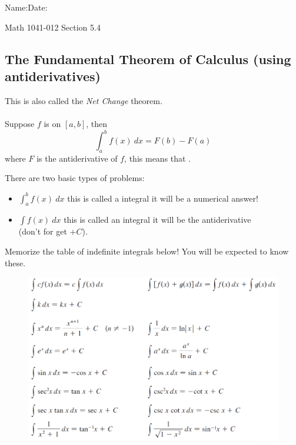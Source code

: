 \documentclass[10pt]{book}
\theoremstyle{definition}
\begin{document}
\begin{flushleft}
Name:\underline{\hspace{13cm}}Date:\underline{\hspace{2cm}}
\end{flushleft}
\begin{center}
{\Large Math 1041-012 \hspace{0.5cm} Section 5.4}
\end{center}

\begin{tcolorbox}
\subsection*{The Fundamental Theorem of Calculus (using antiderivatives)}
This is also called the \textit{Net Change} theorem.\\ \\
Suppose $f$ is \underline{\hspace{4cm}} on $[a,b]$, then
\[
\int_a^b f(x)\ dx = F(b)-F(a)
\]
where $F$ is the antiderivative of $f$, this means that \underline{\hspace{4cm}}.
\end{tcolorbox}
There are two basic types of problems:
\begin{itemize}
    \item {\huge$\displaystyle\int_a^b f(x)\ dx$} this is called a \underline{\hspace{4cm}} integral it will be a numerical answer!\vspace{1cm}
    \item {\huge$\displaystyle\int f(x)\ dx$} this is called an \underline{\hspace{4cm}} integral it will be the antiderivative\\  (don't for get $+C$).
\end{itemize}
Memorize the table of indefinite integrals below! You will be expected to know these.
\begin{figure}[h!]
    \centering
    \includegraphics[width=5in]{basicIndefinites.png}
\end{figure}
\clearpage
\end{document}
